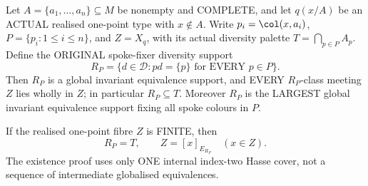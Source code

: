 \begin{lemma}
\label{lem:rh-direct-spoke-fixer}
Let $A=\{a_1,\ldots,a_n\}\subseteq M$ be
nonempty and COMPLETE, and let
$q(x/A)$ be an ACTUAL realised
one-point type with $x\notin A$.
Write $p_i=\col(x,a_i)$,
$P=\{p_i:1\le i\le n\}$, and
$Z=X_q$, with its actual
diversity palette
$T=\bigcap_{p\in P}A_p$.
Define the ORIGINAL spoke-fixer
diversity support
\[
 R_P=\{d\in\mathcal D:
                      pd=\{p\}\text{ for EVERY }p\in P\}.
\]
Then $R_P$ is a global invariant
equivalence support, and EVERY
$R_P$-class meeting $Z$ lies
wholly in $Z$; in particular
$R_P\subseteq T$.
Moreover $R_P$ is the LARGEST
global invariant equivalence
support fixing all spoke colours
in $P$.

If the realised one-point fibre
$Z$ is FINITE, then
\[
                        R_P=T,
             \qquad Z=[x]_{E_{R_P}}
                       \quad(x\in Z).
\]
The existence proof uses only ONE
internal index-two Hasse cover,
not a sequence of intermediate
globalised equivalences.
\end{lemma}

